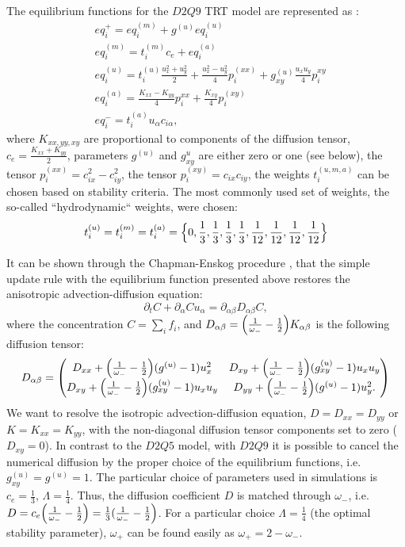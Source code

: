 \documentclass{article}
\newcommand{\beq}{\begin{equation}}
\newcommand{\feq}{\end{equation}}
\newcommand{\omegaplus}{\omega_{+}}
\newcommand{\omegaminus}{\omega_{-}}
\begin{document}
The equilibrium functions for the $D2Q9$ TRT model are represented as \cite{kuzmin-stability-optimal}:
\begin{equation}
\begin{aligned}
&eq_i^{+}=eq_i^{(m)}+g^{(u)} eq_i^{(u)}\\
&eq_i^{(m)}=t_i^{(m)} c_e+ eq_i^{(a)}\\
&eq_i^{(u)}=t_i^{(u)} \frac{u_x^2+u_y^2}{2}+\frac{u_x^2-u_y^2}{4} p_i^{(xx)}+g_{xy}^{(u)}\frac{u_x
u_y}{4} p_i^{xy}\\
&eq_i^{(a)}=\frac{K_{xx}-K_{yy}}{4} p_i^{xx}+\frac{K_{xy}}{4} p_i^{(xy)}\\
&eq_i^{-}=t_i^{(a)}  u_{\alpha} c_{i\alpha},
\end{aligned}
\end{equation}
where $K_{xx,yy,xy}$ are proportional to components of the diffusion tensor,
$c_e=\frac{K_{xx}+K_{yy}}{2}$, parameters $g^{(u)}$ and $g^{u}_{xy}$ are either zero or one (see
below), the tensor $p_i^{(xx)}=c_{ix}^2-c_{iy}^2$, the tensor $p_i^{(xy)}=c_{ix} c_{iy}$, the
weights
$t_i^{(u,m,a)}$ can be chosen based on stability criteria. The most commonly used set of weights, the so-called
``hydrodynamic`` weights, were chosen:
\begin{equation}
t_i^{(u)}=t_i^{(m)}=t_i^{(a)}=\Bigl\{0,\frac{1}{3},\frac{1}{3},\frac{1}{3},\frac{1}{3},\frac{1}{12},
\frac {1}{12},\frac{1}{12},\frac{1}{12}\Bigr\}
\end{equation}
 
It can be shown through the Chapman-Enskog procedure \cite{chapman}, that the simple update rule
with the equilibrium function presented above restores the anisotropic
advection-diffusion equation:
\beq
\partial_t C+ \partial_{\alpha} C u_{\alpha}=\partial_{\alpha\beta} D_{\alpha\beta} C,
\feq
where the concentration $C=\sum_i{f_i}$, and $D_{\alpha\beta}=\Bigl(\frac{1}{\omegaminus}-\frac{1}{2}\Bigr)K_{\alpha\beta}$ is the
following diffusion tensor:
\begin{equation}
D_{\alpha\beta}=
\begin{pmatrix}
D_{xx} + \Bigl(\frac{1}{\omegaminus}-\frac{1}{2}\Bigr)(g^{(u)}-1) u_x^2 &
D_{xy}+\Bigl(\frac{1}{\omegaminus}-\frac{1}{2}\Bigr)(g_{xy}^{(u)}-1)u_x u_y\\
D_{xy} + \Bigl(\frac{1}{\omegaminus}-\frac{1}{2}\Bigr)(g_{xy}^{(u)}-1) u_x u_y&
D_{yy}+\Bigl(\frac{1}{\omegaminus}-\frac{1}{2}\Bigr)(g^{(u)}-1) u_y^2. 
\end{pmatrix}
\end{equation}
We want to resolve the isotropic advection-diffusion equation, $D=D_{xx}=D_{yy}$ or
$K=K_{xx}=K_{yy}$, with the non-diagonal diffusion tensor components set to zero ($D_{xy}=0$). In
contrast to the $D2Q5$ model, with $D2Q9$ it is
possible to cancel the numerical diffusion by the proper choice
of the equilibrium functions, i.e. $g_{xy}^{(u)}=g^{(u)}=1$.  The particular choice of parameters
used in simulations is $c_e=\frac{1}{3}$, $\Lambda=\frac{1}{4}$. Thus, the diffusion coefficient $D$
is matched through $\omegaminus$, i.e. $D=c_e
\Bigl(\frac{1}{\omegaminus}-\frac{1}{2}\Bigr)=\frac{1}{3}(\frac{1}{\omegaminus}-\frac{1}{2}\Bigr)$.
For a particular choice $\Lambda=\frac{1}{4}$ (the optimal stability parameter), $\omegaplus$ can be found easily as
 $\omegaplus=2-\omegaminus$.  
\end{document}

